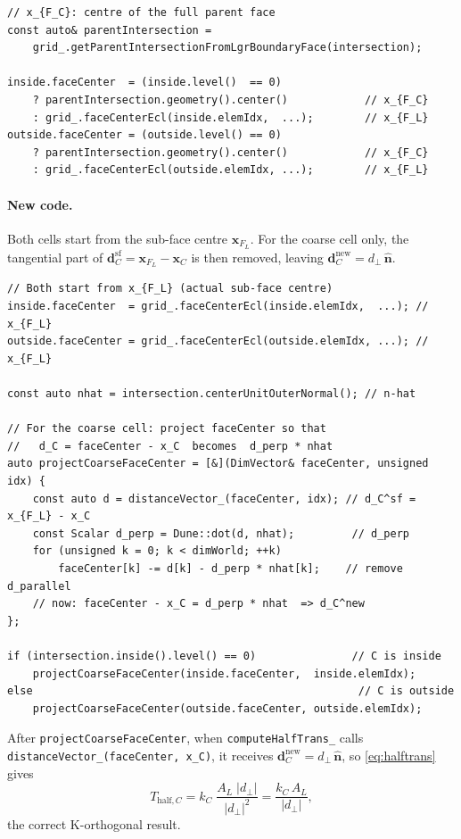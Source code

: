 \documentclass[11pt,a4paper]{article}
\begin{document}
\begin{lstlisting}
// x_{F_C}: centre of the full parent face
const auto& parentIntersection =
    grid_.getParentIntersectionFromLgrBoundaryFace(intersection);

inside.faceCenter  = (inside.level()  == 0)
    ? parentIntersection.geometry().center()            // x_{F_C}
    : grid_.faceCenterEcl(inside.elemIdx,  ...);        // x_{F_L}
outside.faceCenter = (outside.level() == 0)
    ? parentIntersection.geometry().center()            // x_{F_C}
    : grid_.faceCenterEcl(outside.elemIdx, ...);        // x_{F_L}
\end{lstlisting}

\paragraph{New code.}
Both cells start from the sub-face centre $\mathbf{x}_{F_L}$.  For the
coarse cell only, the tangential part of
$\mathbf{d}_C^{\text{sf}} = \mathbf{x}_{F_L} - \mathbf{x}_C$ is then
removed, leaving $\mathbf{d}_C^{\text{new}} = d_\perp\,\hat{\mathbf{n}}$.

\begin{lstlisting}
// Both start from x_{F_L} (actual sub-face centre)
inside.faceCenter  = grid_.faceCenterEcl(inside.elemIdx,  ...); // x_{F_L}
outside.faceCenter = grid_.faceCenterEcl(outside.elemIdx, ...); // x_{F_L}

const auto nhat = intersection.centerUnitOuterNormal(); // n-hat

// For the coarse cell: project faceCenter so that
//   d_C = faceCenter - x_C  becomes  d_perp * nhat
auto projectCoarseFaceCenter = [&](DimVector& faceCenter, unsigned idx) {
    const auto d = distanceVector_(faceCenter, idx); // d_C^sf = x_{F_L} - x_C
    const Scalar d_perp = Dune::dot(d, nhat);         // d_perp
    for (unsigned k = 0; k < dimWorld; ++k)
        faceCenter[k] -= d[k] - d_perp * nhat[k];    // remove d_parallel
    // now: faceCenter - x_C = d_perp * nhat  => d_C^new
};

if (intersection.inside().level() == 0)               // C is inside
    projectCoarseFaceCenter(inside.faceCenter,  inside.elemIdx);
else                                                   // C is outside
    projectCoarseFaceCenter(outside.faceCenter, outside.elemIdx);
\end{lstlisting}

\noindent
After \texttt{projectCoarseFaceCenter}, when \texttt{computeHalfTrans\_}
calls \texttt{distanceVector\_(faceCenter, x\_C)}, it receives
$\mathbf{d}_C^{\text{new}} = d_\perp\,\hat{\mathbf{n}}$, so
\eqref{eq:halftrans} gives
\begin{equation*}
  T_{\text{half},C}
    = k_C\;\frac{A_L\;|d_\perp|}{|d_\perp|^2}
    = \frac{k_C\,A_L}{|d_\perp|},
\end{equation*}
the correct K-orthogonal result.
\end{document}
